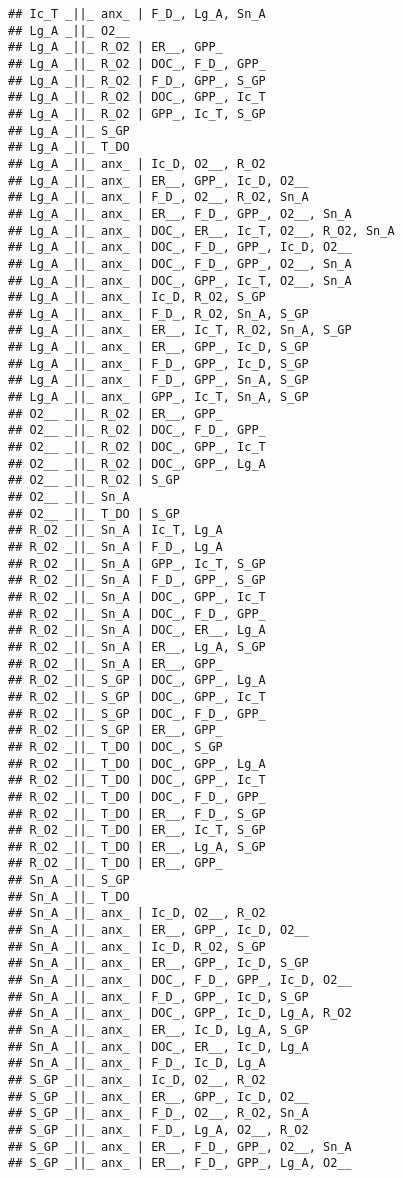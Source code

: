 \documentclass[
]{article}
\begin{document}
\begin{verbatim}
## Ic_T _||_ anx_ | F_D_, Lg_A, Sn_A
## Lg_A _||_ O2__
## Lg_A _||_ R_O2 | ER__, GPP_
## Lg_A _||_ R_O2 | DOC_, F_D_, GPP_
## Lg_A _||_ R_O2 | F_D_, GPP_, S_GP
## Lg_A _||_ R_O2 | DOC_, GPP_, Ic_T
## Lg_A _||_ R_O2 | GPP_, Ic_T, S_GP
## Lg_A _||_ S_GP
## Lg_A _||_ T_DO
## Lg_A _||_ anx_ | Ic_D, O2__, R_O2
## Lg_A _||_ anx_ | ER__, GPP_, Ic_D, O2__
## Lg_A _||_ anx_ | F_D_, O2__, R_O2, Sn_A
## Lg_A _||_ anx_ | ER__, F_D_, GPP_, O2__, Sn_A
## Lg_A _||_ anx_ | DOC_, ER__, Ic_T, O2__, R_O2, Sn_A
## Lg_A _||_ anx_ | DOC_, F_D_, GPP_, Ic_D, O2__
## Lg_A _||_ anx_ | DOC_, F_D_, GPP_, O2__, Sn_A
## Lg_A _||_ anx_ | DOC_, GPP_, Ic_T, O2__, Sn_A
## Lg_A _||_ anx_ | Ic_D, R_O2, S_GP
## Lg_A _||_ anx_ | F_D_, R_O2, Sn_A, S_GP
## Lg_A _||_ anx_ | ER__, Ic_T, R_O2, Sn_A, S_GP
## Lg_A _||_ anx_ | ER__, GPP_, Ic_D, S_GP
## Lg_A _||_ anx_ | F_D_, GPP_, Ic_D, S_GP
## Lg_A _||_ anx_ | F_D_, GPP_, Sn_A, S_GP
## Lg_A _||_ anx_ | GPP_, Ic_T, Sn_A, S_GP
## O2__ _||_ R_O2 | ER__, GPP_
## O2__ _||_ R_O2 | DOC_, F_D_, GPP_
## O2__ _||_ R_O2 | DOC_, GPP_, Ic_T
## O2__ _||_ R_O2 | DOC_, GPP_, Lg_A
## O2__ _||_ R_O2 | S_GP
## O2__ _||_ Sn_A
## O2__ _||_ T_DO | S_GP
## R_O2 _||_ Sn_A | Ic_T, Lg_A
## R_O2 _||_ Sn_A | F_D_, Lg_A
## R_O2 _||_ Sn_A | GPP_, Ic_T, S_GP
## R_O2 _||_ Sn_A | F_D_, GPP_, S_GP
## R_O2 _||_ Sn_A | DOC_, GPP_, Ic_T
## R_O2 _||_ Sn_A | DOC_, F_D_, GPP_
## R_O2 _||_ Sn_A | DOC_, ER__, Lg_A
## R_O2 _||_ Sn_A | ER__, Lg_A, S_GP
## R_O2 _||_ Sn_A | ER__, GPP_
## R_O2 _||_ S_GP | DOC_, GPP_, Lg_A
## R_O2 _||_ S_GP | DOC_, GPP_, Ic_T
## R_O2 _||_ S_GP | DOC_, F_D_, GPP_
## R_O2 _||_ S_GP | ER__, GPP_
## R_O2 _||_ T_DO | DOC_, S_GP
## R_O2 _||_ T_DO | DOC_, GPP_, Lg_A
## R_O2 _||_ T_DO | DOC_, GPP_, Ic_T
## R_O2 _||_ T_DO | DOC_, F_D_, GPP_
## R_O2 _||_ T_DO | ER__, F_D_, S_GP
## R_O2 _||_ T_DO | ER__, Ic_T, S_GP
## R_O2 _||_ T_DO | ER__, Lg_A, S_GP
## R_O2 _||_ T_DO | ER__, GPP_
## Sn_A _||_ S_GP
## Sn_A _||_ T_DO
## Sn_A _||_ anx_ | Ic_D, O2__, R_O2
## Sn_A _||_ anx_ | ER__, GPP_, Ic_D, O2__
## Sn_A _||_ anx_ | Ic_D, R_O2, S_GP
## Sn_A _||_ anx_ | ER__, GPP_, Ic_D, S_GP
## Sn_A _||_ anx_ | DOC_, F_D_, GPP_, Ic_D, O2__
## Sn_A _||_ anx_ | F_D_, GPP_, Ic_D, S_GP
## Sn_A _||_ anx_ | DOC_, GPP_, Ic_D, Lg_A, R_O2
## Sn_A _||_ anx_ | ER__, Ic_D, Lg_A, S_GP
## Sn_A _||_ anx_ | DOC_, ER__, Ic_D, Lg_A
## Sn_A _||_ anx_ | F_D_, Ic_D, Lg_A
## S_GP _||_ anx_ | Ic_D, O2__, R_O2
## S_GP _||_ anx_ | ER__, GPP_, Ic_D, O2__
## S_GP _||_ anx_ | F_D_, O2__, R_O2, Sn_A
## S_GP _||_ anx_ | F_D_, Lg_A, O2__, R_O2
## S_GP _||_ anx_ | ER__, F_D_, GPP_, O2__, Sn_A
## S_GP _||_ anx_ | ER__, F_D_, GPP_, Lg_A, O2__

\end{verbatim}
\end{document}
